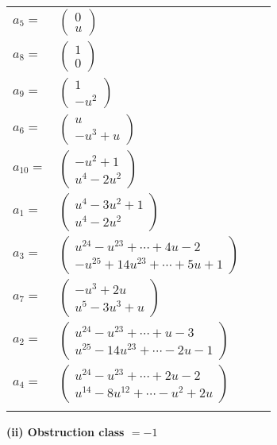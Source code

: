 \documentclass[1p]{elsarticle_modified}
\theoremstyle{definition}
\begin{document}
\begin{tabular}{m{7pt} m{180pt} m{7pt} m{180pt} }
\flushright $a_{5}=$&$\begin{pmatrix}0\\u\end{pmatrix}$ \\
\flushright $a_{8}=$&$\begin{pmatrix}1\\0\end{pmatrix}$ \\
\flushright $a_{9}=$&$\begin{pmatrix}1\\- u^2\end{pmatrix}$ \\
\flushright $a_{6}=$&$\begin{pmatrix}u\\- u^3+u\end{pmatrix}$ \\
\flushright $a_{10}=$&$\begin{pmatrix}- u^2+1\\u^4-2 u^2\end{pmatrix}$ \\
\flushright $a_{1}=$&$\begin{pmatrix}u^4-3 u^2+1\\u^4-2 u^2\end{pmatrix}$ \\
\flushright $a_{3}=$&$\begin{pmatrix}u^{24}- u^{23}+\cdots+4 u-2\\- u^{25}+14 u^{23}+\cdots+5 u+1\end{pmatrix}$ \\
\flushright $a_{7}=$&$\begin{pmatrix}- u^3+2 u\\u^5-3 u^3+u\end{pmatrix}$ \\
\flushright $a_{2}=$&$\begin{pmatrix}u^{24}- u^{23}+\cdots+u-3\\u^{25}-14 u^{23}+\cdots-2 u-1\end{pmatrix}$ \\
\flushright $a_{4}=$&$\begin{pmatrix}u^{24}- u^{23}+\cdots+2 u-2\\u^{14}-8 u^{12}+\cdots- u^2+2 u\end{pmatrix}$\\&\end{tabular}
\flushleft \textbf{(ii) Obstruction class $= -1$}\\~\\
\end{document}
